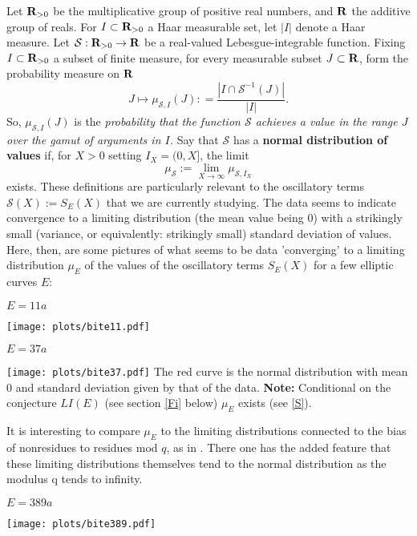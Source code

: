 \documentclass[11pt]{article}
\theoremstyle{plain}
\theoremstyle{definition}
\numberwithin{equation}{section}
\numberwithin{figure}{section}
\numberwithin{table}{section}
\def\S{\mathcal{S}}
\def\R{{\bf R}}
\begin{document}
Let ${\R}_{>0}$ be the multiplicative group of positive real numbers, and ${\R}$ the additive group of reals. For $I \subset {\R}_{>0}$ a Haar measurable set, let $|I|$ denote a Haar measure.  Let ${\S}:{\R}_{>0} \to {\R}$ be a real-valued Lebesgue-integrable function.  Fixing $I \subset {\R}_{>0}$ a subset  of finite measure,  for every measurable subset $J\subset {\R}$, form the probability measure on ${\R}$
$$J\mapsto \mu_{{\S},I}(J): = {\frac{|I\cap {\S}^{-1}(J)|}{|I|}}.$$  So, $\mu_{{\S},I}(J)$ is the {\it probability that the function ${\S}$ achieves a value in the range $J$ over the gamut of arguments in $I$.}   Say that ${\S}$ has a {\bf normal distribution of values} if, for $X > 0$ setting $I_X= (0,X]$, the limit  $$\mu_{{\S}}:= \lim_{X \to \infty}\mu_{{\S},I_X}$$ exists. These  definitions are particularly relevant to the oscillatory terms ${\S}(X):= S_E(X)$ that we are currently studying. The data seems to indicate convergence to a limiting distribution (the  mean  value being $0$) with a strikingly small (variance, or equivalently: strikingly small) standard deviation of values.
\vskip20pt
Here, then, are some pictures  of what seems to be data 'converging' to a limiting  distribution $\mu_E$ of the values of the oscillatory terms $S_E(X)$ for a few elliptic curves $E$:
  \vskip10pt
  \centerline{ $E = 11a$}
 \vskip10pt
 \hskip100pt \texttt{[image: plots/bite11.pdf]}
    \vskip10pt
  \centerline{ $E = 37a$}
  \vskip10pt
 \hskip100pt \texttt{[image: plots/bite37.pdf]}
    \vskip10pt
       The red curve is the normal distribution with mean $0$ and standard deviation given by that of the data.
   \vskip10pt
    {\bf  Note: } Conditional on the conjecture $LI(E)$ (see section \ref{Fi} below) $\mu_E$ exists (see \ref{S}).

     It is interesting  to compare $\mu_E$ to the limiting distributions connected to the bias of nonresidues to residues mod $q$, as in \cite{R-S}. There one has the added feature that these limiting distributions themselves tend to the normal distribution as the modulus q tends to infinity.
  \centerline{ $E = 389a$}
  \vskip10pt
\hskip100pt  \texttt{[image: plots/bite389.pdf]}

\end{document}
